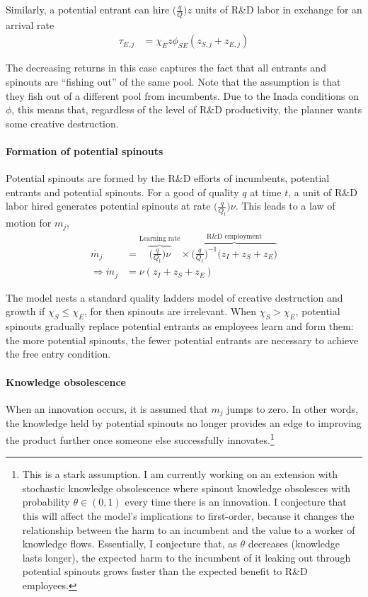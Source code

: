 \documentclass[11pt,english]{article}
\theoremstyle{remark}
\begin{document}
Similarly, a potential entrant can hire $\Big( \frac{q}{Q}\Big) z$ units of R\&D labor in exchange for an arrival rate 
\begin{align}
\tau_{E,j} &= \chi_E z \phi_{SE} (z_{S,j} + z_{E,j})  
\end{align}

The decreasing returns in this case captures the fact that all entrants and spinouts are ``fishing out'' of the same pool. Note that the assumption is that they fish out of a different pool from incumbents. Due to the Inada conditions on $\phi$, this means that, regardless of the level of R\&D productivity, the planner wants some creative destruction. 

\paragraph{Formation of potential spinouts}

Potential spinouts are formed by the R\&D efforts of incumbents, potential entrants and potential spinouts. For a good of quality $q$ at time $t$, a unit of R\&D labor hired generates potential spinouts at rate $\Big( \frac{q}{Q_t}\Big) \nu$. This leads to a law of motion for $m_j$,
\begin{align}
	\dot{m_j} &= \overbrace{\Big( \frac{q}{Q_t}\Big) \nu}^{\textrm{Learning rate}}\times \overbrace{\Big( \frac{q}{Q_t}\Big)^{-1} \Big( z_I + z_S + z_E \Big)}^{\textrm{R\&D  employment}} \nonumber \\
	       \Rightarrow \dot{m}_j &= \nu (z_I + z_S + z_E) \label{mj_law_of_motion}
\end{align}

The model nests a standard quality ladders model of creative destruction and growth if $\chi_S \le \chi_E$, for then spinouts are irrelevant. When $\chi_S > \chi_E$, potential spinouts gradually replace potential entrants as employees learn and form them: the more potential spinouts, the fewer potential entrants are necessary to achieve the free entry condition.

\paragraph{Knowledge obsolescence}

When an innovation occurs, it is assumed that $m_j$ jumps to zero. In other words, the knowledge held by potential spinouts no longer provides an edge to improving the product further once someone else successfully innovates.\footnote{This is a stark assumption. I am currently working on an extension with stochastic knowledge obsolescence where spinout knowledge obsolesces with probability $\theta \in (0,1)$ every time there is an innovation. I conjecture that this will affect the model's implications to first-order, because it changes the relationship between the harm to an incumbent and the value to a worker of knowledge flows. Essentially, I conjecture that, as $\theta$ decreases (knowledge lasts longer), the expected harm to the incumbent of it leaking out through potential spinouts grows faster than the expected benefit to R\&D employees.}
\end{document}
